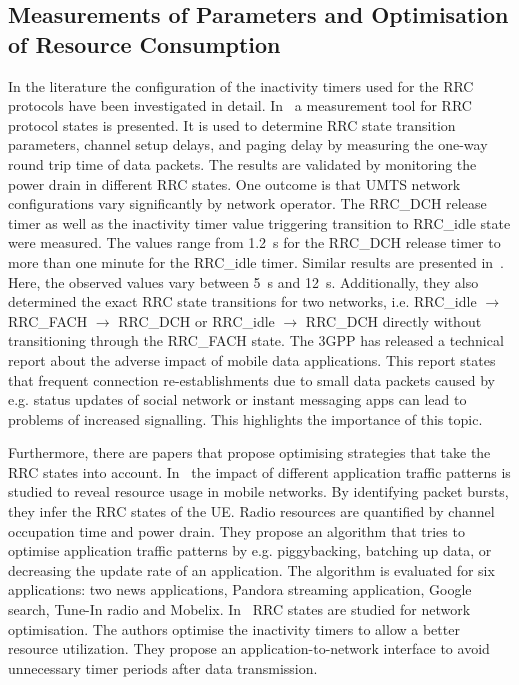 \subsection{Measurements of  Parameters and Optimisation of Resource Consumption}\label{sec:network:background:measurement_optimisation}

In the literature the configuration of the inactivity timers used for the \gls{RRC} protocols have been investigated in detail.
In~\cite{Perala2009} a measurement tool for \gls{RRC} protocol states is presented. 
It is used to determine \gls{RRC} state transition parameters, channel setup delays, and paging delay by measuring the one-way round trip time of data packets.
The results are validated by monitoring the power drain in different \gls{RRC} states.
One outcome is that \gls{UMTS} network configurations vary significantly by network operator.
The \gls{RRC_DCH} release timer as well as the inactivity timer value triggering transition to \gls{RRC_idle} state were measured.
The values range from \SI{1.2}{\second} for the \gls{RRC_DCH} release timer to more than one minute for the \gls{RRC_idle} timer.
Similar results are presented in~\cite{Qian2010a}.
Here, the observed values vary between \SI{5}{\second} and \SI{12}{\second}. 
Additionally, they also determined the exact \gls{RRC} state transitions for two networks, i.e. \gls{RRC_idle} \(\rightarrow\) \gls{RRC_FACH} \(\rightarrow\) \gls{RRC_DCH} or \gls{RRC_idle} \(\rightarrow\) \gls{RRC_DCH} directly without transitioning through the \gls{RRC_FACH} state.
The \gls{3GPP} has released a technical report \cite{3GPP_22801} about the adverse impact of mobile data applications.
This report states that frequent connection re-establishments due to small data packets caused by e.g. status updates of social network or instant messaging apps can lead to problems of increased signalling.
This highlights the importance of this topic.

Furthermore, there are papers that propose optimising strategies that take the \gls{RRC} states into account. 
In~\cite{Qian2011a} the impact of different application traffic patterns is studied to reveal resource usage in mobile networks.
By identifying packet bursts, they infer the \gls{RRC} states of the \gls{UE}.
Radio resources are quantified by channel occupation time and power drain.
They propose an algorithm that tries to optimise application traffic patterns by e.g. piggybacking, batching up data, or decreasing the update rate of an application.
The algorithm is evaluated for six applications: two news applications, Pandora streaming application, Google search, Tune-In radio and Mobelix. 
In~\cite{Qian2010b} \gls{RRC} states are studied for network optimisation.
The authors optimise the inactivity timers to allow a better resource utilization. 
They propose an application-to-network interface to avoid unnecessary timer periods after data transmission.

